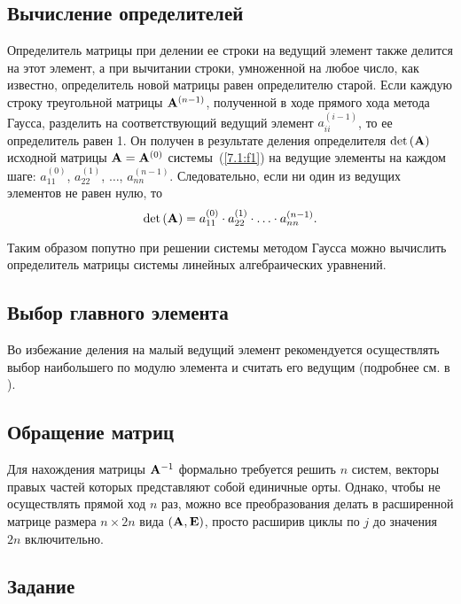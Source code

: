 \documentclass[12pt]{article}
\begin{document}
    \subsection*{Вычисление определителей}

    Определитель матрицы при делении ее строки на ведущий элемент также делится на этот элемент, а при вычитании строки, умноженной на любое число, как известно, определитель новой матрицы равен определителю старой.
    Если каждую строку треугольной матрицы $\bold{A}^{\left(n-1\right)}$, полученной в ходе прямого хода метода Гаусса, разделить на соответствующий ведущий элемент $a_{{ii}}^{\left(i-1\right)}$, то ее определитель равен 1. Он получен в результате деления определителя $\det\left(\bold{A}\right)$ исходной матрицы $\bold{A}=\bold{A}^{\left(0\right)}$ системы~(\ref{7.1:f1}) на ведущие элементы на каждом шаге: $a_{11}^{\left(0\right)}$, $a_{22}^{\left(1\right)}$, $\ldots$, $a_{nn}^{\left(n-1\right)}$. Следовательно, если ни один из ведущих элементов не равен нулю, то
    \begin{equation}
        \det\left(\bold{A}\right)
        =a_{11}^{\left(0\right)}\cdot a_{22}^{\left(1\right)}\cdot\ldots\cdot a_{nn}^{\left(n-1\right)}.
    \end{equation}

    Таким образом попутно при решении системы методом Гаусса можно вычислить определитель матрицы системы линейных алгебраических уравнений.

    \subsection*{Выбор главного элемента}

    Во избежание деления на малый ведущий элемент рекомендуется осуществлять выбор наибольшего по модулю элемента и считать его ведущим (подробнее см. в \cite{lebedeva}).

    \subsection*{Обращение матриц}
    Для нахождения матрицы $\bold{A}^{-1}$ формально требуется решить $n$ систем, векторы правых частей которых представляют собой единичные орты. Однако, чтобы не осуществлять прямой ход $n$ раз, можно все преобразования делать в расширенной матрице размера $n \times 2n$ вида $\left(\bold{A},\bold{E}\right)$, просто расширив циклы по $j$ до значения $2n$ включительно.

    \subsection*{Задание}
	
\end{document}
